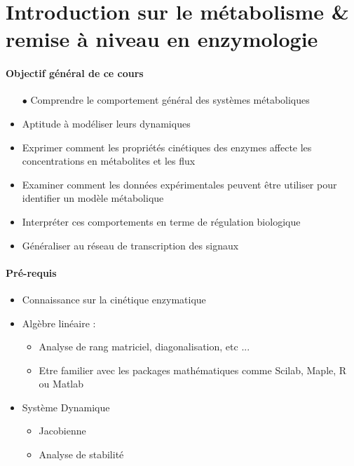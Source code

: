 \renewcommand{\labelitemi}{$\bullet$}
\renewcommand{\labelitemii}{$\cdot$}
\renewcommand{\labelitemiii}{$\diamond$}
\renewcommand{\labelitemiv}{$\ast$}

\section{Introduction sur le métabolisme \& remise à niveau en enzymologie}

\paragraph{Objectif général de ce cours}
\begin{itemize}
    \item[$\bullet$] Comprendre le comportement général des systèmes métaboliques
    \item Aptitude à modéliser leurs dynamiques
    \item Exprimer comment les propriétés cinétiques des enzymes affecte les concentrations en métabolites et les flux
    \item Examiner comment les données expérimentales peuvent être utiliser pour identifier un modèle métabolique
    \item Interpréter ces comportements en terme de régulation biologique
    \item Généraliser au réseau de transcription des signaux
\end{itemize}

\paragraph{Pré-requis}
\begin{itemize}
    \item Connaissance sur la cinétique enzymatique
    \item Algèbre linéaire : 
    \begin{itemize}
    	\item Analyse de rang matriciel, diagonalisation, etc ...
        \item Etre familier avec les packages mathématiques comme Scilab, Maple, R ou Matlab
    \end{itemize}
    \item Système Dynamique
    \begin{itemize}
        \item Jacobienne
        \item Analyse de stabilité
    \end{itemize}
\end{itemize}

